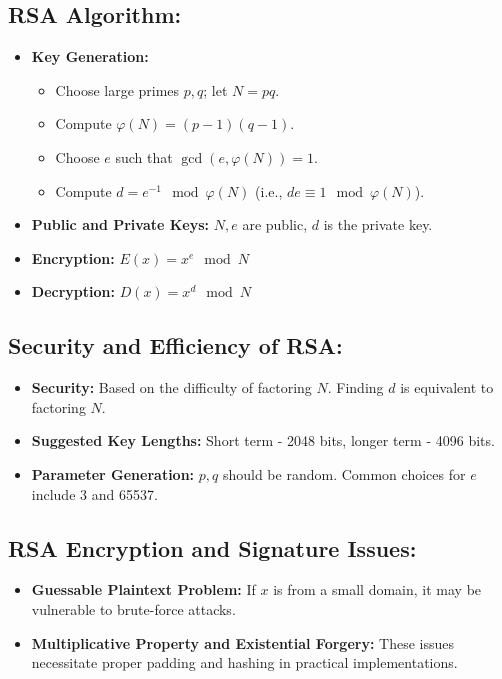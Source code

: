 \documentclass[12pt]{article}
\begin{document}
\subsection*{RSA Algorithm:}
\begin{itemize}
    \item \textbf{Key Generation:}
    \begin{itemize}
        \item Choose large primes \( p, q \); let \( N = pq \).
        \item Compute \( \varphi(N) = (p-1)(q-1) \).
        \item Choose \( e \) such that \( \gcd(e, \varphi(N)) = 1 \).
        \item Compute \( d = e^{-1} \mod \varphi(N) \) (i.e., \( de \equiv 1 \mod \varphi(N) \)).
    \end{itemize}
    \item \textbf{Public and Private Keys:} \( N, e \) are public, \( d \) is the private key.
    \item \textbf{Encryption:} \( E(x) = x^e \mod N \)
    \item \textbf{Decryption:} \( D(x) = x^d \mod N \)
\end{itemize}

\subsection*{Security and Efficiency of RSA:}
\begin{itemize}
    \item \textbf{Security:} Based on the difficulty of factoring \( N \). Finding \( d \) is equivalent to factoring \( N \).
    \item \textbf{Suggested Key Lengths:} Short term - 2048 bits, longer term - 4096 bits.
    \item \textbf{Parameter Generation:} \( p, q \) should be random. Common choices for \( e \) include 3 and 65537.
\end{itemize}

\subsection*{RSA Encryption and Signature Issues:}
\begin{itemize}
    \item \textbf{Guessable Plaintext Problem:} If \( x \) is from a small domain, it may be vulnerable to brute-force attacks.
    \item \textbf{Multiplicative Property and Existential Forgery:} These issues necessitate proper padding and hashing in practical implementations.
\end{itemize}
\end{document}
